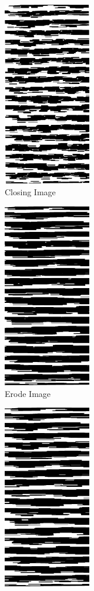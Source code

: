 \begin{figure}[H]
\begin{subfigure}[b]{0.3\textwidth}
         \centering
         \includegraphics[width=\textwidth, height=8cm]{images/line_step4.png}
         \caption{Closing Image}
         \label{fig:test_Closing}
     \end{subfigure}
     \hfill%
      \begin{subfigure}[b]{0.3\textwidth}
         \centering
         \includegraphics[width=\textwidth, height=8cm]{images/line_step5.png}
         \caption{Erode Image}
         \label{fig:test_Erode}
     \end{subfigure}
     \hfill%
      \begin{subfigure}[b]{0.3\textwidth}
         \centering
         \includegraphics[width=\textwidth, height=8cm]{images/line_step6.png}

\end{subfigure}
\end{figure}
